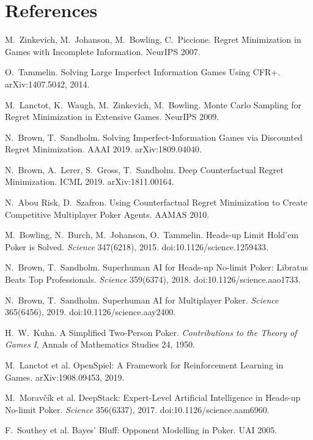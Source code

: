 \documentclass[10pt,a4paper]{article}
\begin{document}
\section*{References}
\sloppy
\begin{enumerate}[label={[\arabic*]},leftmargin=22pt,itemsep=1pt]\small
  \item M.~Zinkevich, M.~Johanson, M.~Bowling, C.~Piccione. Regret Minimization in Games with Incomplete Information. NeurIPS 2007.
  \item O.~Tammelin. Solving Large Imperfect Information Games Using CFR+. arXiv:1407.5042, 2014.
  \item M.~Lanctot, K.~Waugh, M.~Zinkevich, M.~Bowling. Monte Carlo Sampling for Regret Minimization in Extensive Games. NeurIPS 2009.
  \item N.~Brown, T.~Sandholm. Solving Imperfect-Information Games via Discounted Regret Minimization. AAAI 2019. arXiv:1809.04040.
  \item N.~Brown, A.~Lerer, S.~Gross, T.~Sandholm. Deep Counterfactual Regret Minimization. ICML 2019. arXiv:1811.00164.
  \item N.~Abou Risk, D.~Szafron. Using Counterfactual Regret Minimization to Create Competitive Multiplayer Poker Agents. AAMAS 2010.
  \item M.~Bowling, N.~Burch, M.~Johanson, O.~Tammelin. Heads-up Limit Hold'em Poker is Solved. \emph{Science} 347(6218), 2015. doi:10.1126/science.1259433.
  \item N.~Brown, T.~Sandholm. Superhuman AI for Heads-up No-limit Poker: Libratus Beats Top Professionals. \emph{Science} 359(6374), 2018. doi:10.1126/science.aao1733.
  \item N.~Brown, T.~Sandholm. Superhuman AI for Multiplayer Poker. \emph{Science} 365(6456), 2019. doi:10.1126/science.aay2400.
  \item H.~W.~Kuhn. A Simplified Two-Person Poker. \emph{Contributions to the Theory of Games I}, Annals of Mathematics Studies 24, 1950.
  \item M.~Lanctot et al. OpenSpiel: A Framework for Reinforcement Learning in Games. arXiv:1908.09453, 2019.
  \item M.~Morav\v{c}\'{i}k et al. DeepStack: Expert-Level Artificial Intelligence in Heads-up No-limit Poker. \emph{Science} 356(6337), 2017. doi:10.1126/science.aam6960.
  \item F.~Southey et al. Bayes' Bluff: Opponent Modelling in Poker. UAI 2005.
\end{enumerate}
\end{document}
